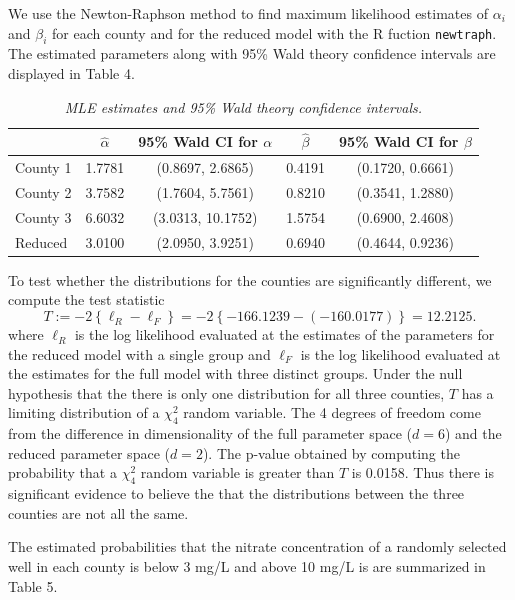 \documentclass[12pt]{article}
\begin{document}
\begin{enumerate}
    We use the Newton-Raphson method to find maximum likelihood estimates of $\alpha_i$ and $\beta_i$ for each county and for the reduced model with the R fuction
    \texttt{newtraph}. The estimated parameters along with 95\% Wald theory confidence intervals are displayed in Table 4.

    \begin{table}[h]
      \caption{\emph{MLE estimates and 95\% Wald theory confidence intervals.}}
      \centering
      \begin{tabular}{|l|c|c|c|c|}
        \hline
        & $\hat{\alpha}$ & 95\% Wald CI for $\alpha$ & $\hat{\beta}$ & 95\% Wald CI for $\beta$ \\
        \hline 
        County 1 & 1.7781 & (0.8697, 2.6865) & 0.4191 & (0.1720, 0.6661) \\
        \hline
        County 2 & 3.7582 & (1.7604, 5.7561) & 0.8210 & (0.3541, 1.2880) \\
        \hline
        County 3 & 6.6032 & (3.0313, 10.1752) & 1.5754 & (0.6900, 2.4608) \\
        \hline
        Reduced & 3.0100 & (2.0950, 3.9251) & 0.6940 & (0.4644, 0.9236) \\
        \hline
      \end{tabular}
    \end{table}

    To test whether the distributions for the counties are significantly different, we compute the test statistic
    \[
      T := -2\left\{ \ell_{R} - \ell_{F} \right\} = -2\left\{ -166.1239 - (-160.0177) \right\} = 12.2125.
    \]
    where $\ell_{R}$ is the log likelihood evaluated at the estimates of the parameters for the reduced model with a single group and $\ell_{F}$ is
    the log likelihood evaluated at the estimates for the full model with three distinct groups. Under the null hypothesis that the there is only one
    distribution for all three counties, $T$ has a limiting distribution of a $\chi_{4}^{2}$ random variable. The 4 degrees of freedom come from the
    difference in dimensionality of the full parameter space ($d = 6$) and the reduced parameter space ($d = 2$). The p-value obtained by computing
    the probability that a $\chi_{4}^{2}$ random variable is greater than $T$ is 0.0158. Thus there is significant evidence to believe the that the
    distributions between the three counties are not all the same.

    The estimated probabilities that the nitrate concentration of a randomly selected well in each county is below 3 mg/L and above 10 mg/L is are
    summarized in Table 5.


\end{enumerate}
\end{document}
